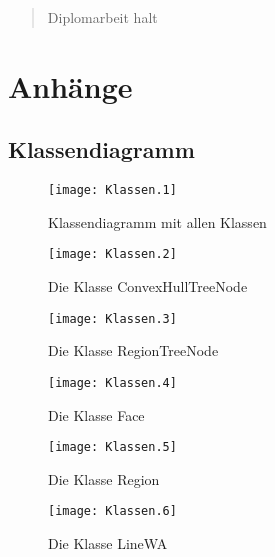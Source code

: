 




\begin{abstract}
Diplomarbeit halt
\end{abstract}
\dominitoc[e]
\doparttoc

\tableofcontents 

%








\begin{appendix} \label{anhang}
\part*{Anhänge}
\adjustptc[-2]
\parttoc

   
 
 \chapter{Klassendiagramm}
 \begin{landscape}
 \begin{figure}	
	\texttt{[image: Klassen.1]}
	\caption{Klassendiagramm mit allen Klassen}
	\label{fig:UML_Klassendiagramm}
\end{figure}

 \begin{figure}	
	\texttt{[image: Klassen.2]}
	\caption{Die Klasse ConvexHullTreeNode}
	\label{fig:UML_CHTN}
\end{figure}

 \begin{figure}	
	\texttt{[image: Klassen.3]}
	\caption{Die Klasse RegionTreeNode}
	\label{fig:UML_RTN}
\end{figure}

 \begin{figure}	
	\texttt{[image: Klassen.4]}
	\caption{Die Klasse Face}
	\label{fig:UML_Face}
\end{figure}

 \begin{figure}	
	\texttt{[image: Klassen.5]}
	\caption{Die Klasse Region}
	\label{fig:UML_Region}
\end{figure}

 \begin{figure}	
	\texttt{[image: Klassen.6]}
	\caption{Die Klasse LineWA}
	\label{fig:UML_LineWA}
\end{figure}


\end{landscape}
\end{appendix}
